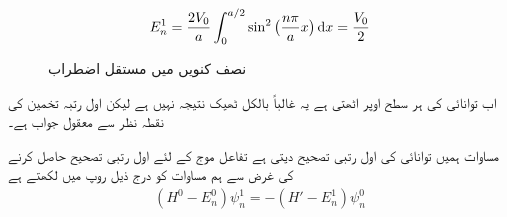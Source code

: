 \begin{align*}
E_n^1 = \frac{2V_0}{a} \int_0^{a/2} \sin^2 \big(\frac{n \pi}{a} x\big ) \dif  x= \frac{V_0}{2}
\end{align*}

\begin{figure}
\centering
{}
\caption{نصف  کنویں میں مستقل اضطراب}
\label{شکل_غیر_تابع_اضطراب_نصف_چکور_مستقل_اضطراب}
\end{figure}


اب توانائی کی ہر سطح  
اوپر  اٹھتی ہے یہ غالباً بالکل ٹھیک نتیجہ نہیں ہے لیکن اول رتبہ تخمین کی نقطہ نظر سے معقول جواب ہے۔

 مساوات  ہمیں توانائی کی اول رتبی  تصحیح دیتی ہے تفاعل موج کے لئے اول رتبی تصحیح حاصل کرنے کی غرض سے ہم مساوات  کو درج ذیل روپ میں لکھتے ہے 
\begin{align}
(H^0 - E_n^0) \psi_n^1 = - (H' - E_n^1) \psi_n^0
\end{align}

